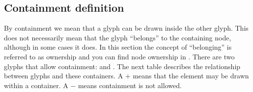 \subsection{Containment definition}
\label{sec:containment}

By containment we mean that a glyph can be drawn inside the other glyph. This does not necessarily mean that the glyph ``belongs'' to the containing node, although in some cases it does. In this section the concept of ``belonging'' is referred to as ownership and you can find node ownership in . There are two glyphs that allow containment:  and . The next table describes the relationship between \PD glyphs and these containers. A $+$ means that the element may be drawn within a container. A $-$ means containment is not allowed.

